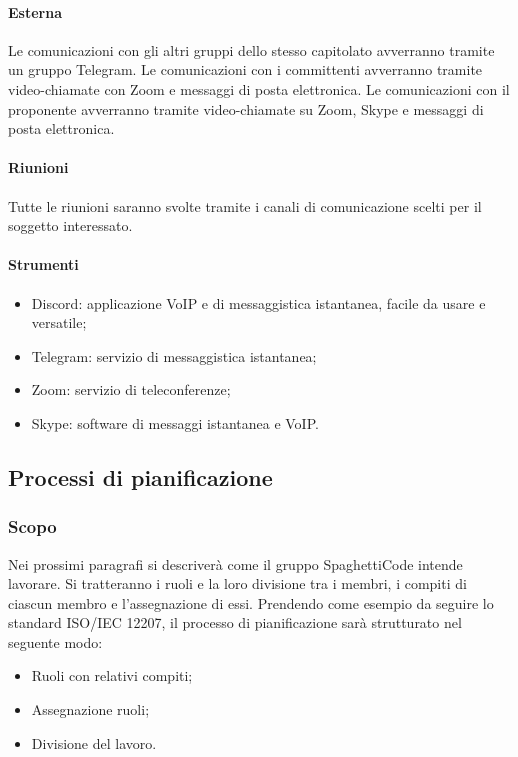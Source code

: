 \documentclass[../norme_di_progetto.tex]{subfiles}
\begin{document}
        \paragraph{Esterna}
        Le comunicazioni con gli altri gruppi dello stesso capitolato avverranno tramite un gruppo Telegram.
        Le comunicazioni con i committenti avverranno tramite video-chiamate con Zoom e messaggi di posta elettronica.
        Le comunicazioni con il proponente avverranno tramite video-chiamate su Zoom, Skype e messaggi di posta elettronica.
        \paragraph{Riunioni}
        Tutte le riunioni saranno svolte tramite i canali di comunicazione scelti per il soggetto interessato. 
        \paragraph{Strumenti}
        \begin{itemize}
            \item Discord: applicazione VoIP e di messaggistica istantanea, facile da usare e versatile;
            \item Telegram: servizio di messaggistica istantanea;
            \item Zoom: servizio di teleconferenze;
            \item Skype: software di messaggi istantanea e VoIP.
        \end{itemize}

\subsection{Processi di pianificazione}
    \subsubsection{Scopo}
    Nei prossimi paragrafi si descriverà come il gruppo SpaghettiCode intende lavorare. Si tratteranno i ruoli e la loro divisione tra i membri, i compiti di ciascun membro e l'assegnazione di essi. Prendendo come esempio da seguire lo standard ISO/IEC 12207, il processo di pianificazione sarà strutturato nel seguente modo:
    \begin{itemize}
        \item Ruoli con relativi compiti;
        \item Assegnazione ruoli;
        \item Divisione del lavoro.
    \end{itemize}
\end{document}
